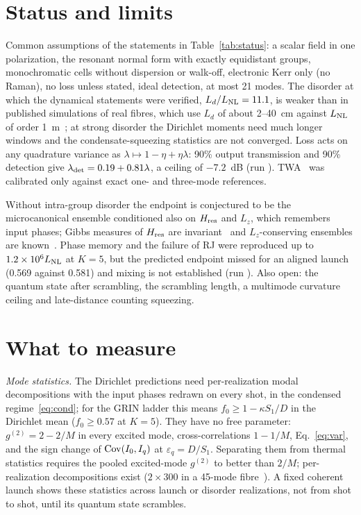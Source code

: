 \documentclass[aps,pra,twocolumn,superscriptaddress,nofootinbib,floatfix]{revtex4-2}
\newcommand{\LNL}{L_{\rm NL}}
\DeclareRobustCommand{\run}[1]{{\small\path{#1}}}
\begin{document}
\section{Status and limits}\label{sec:status}


Common assumptions of the statements in Table~\ref{tab:status}: a scalar field in one polarization, the
resonant normal form with exactly equidistant groups, monochromatic cells without dispersion or walk-off, electronic Kerr
only (no Raman), no loss unless stated, ideal detection, at most 21 modes. The disorder at which the dynamical
statements were verified, $L_d/\LNL=11.1$, is weaker than in published simulations of real fibres, which use $L_d$ of
about 2--40~cm against $\LNL$ of order 1~m~\cite{fusaro2019,garnier2019}; at strong disorder the Dirichlet moments need much longer windows and
the condensate-squeezing statistics are not converged. Loss acts on any quadrature variance as
$\lambda\mapsto1-\eta+\eta\lambda$: 90\% output transmission and 90\% detection give $\lambda_{\rm det}=0.19+0.81\lambda$,
a ceiling of $-7.2$~dB (run \run{2026-10-18-gpt-b-grin-squeezing}). TWA~\cite{sinatra2002,polkovnikov2010} was calibrated only against exact one- and three-mode
references.

Without intra-group disorder the endpoint is conjectured to be the microcanonical ensemble conditioned also on
$H_{\rm res}$ and $L_z$, which remembers input phases; Gibbs measures of $H_{\rm res}$ are invariant~\cite{germain2015}
and $L_z$-conserving ensembles are known~\cite{wu2022}. Phase memory
and the failure of RJ were reproduced up to $1.2\times10^6\LNL$ at $K=5$, but the predicted endpoint missed for an aligned
launch (0.569 against 0.581) and mixing is not established (run \run{2026-10-17-gpt-b-gge}). Also open: the quantum state after scrambling, the scrambling length, a multimode curvature
ceiling and late-distance counting squeezing.

\section{What to measure}\label{sec:outlook}

\textit{Mode statistics.} The Dirichlet predictions need per-realization modal decompositions with the input phases
redrawn on every shot, in the condensed regime~\eqref{eq:cond}; for the GRIN ladder this means
$f_0\ge1-\kappa S_1/D$ in the Dirichlet mean ($f_0\ge0.57$ at $K=5$). They have no free parameter: $g^{(2)}=2-2/M$ in every excited mode, cross-correlations $1-1/M$,
Eq.~\eqref{eq:var}, and the sign change of ${\rm Cov}(I_0,I_q)$ at $\varepsilon_q=D/S_1$. Separating them from thermal
statistics requires the pooled excited-mode $g^{(2)}$ to better than $2/M$; per-realization decompositions exist
($2\times300$ in a 45-mode fibre~\cite{baudin2023}). A fixed coherent launch shows these statistics across launch or
disorder realizations, not from shot to shot, until its quantum state scrambles.
\end{document}
